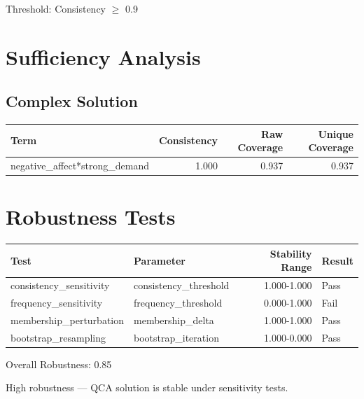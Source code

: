 \documentclass[12pt,a4paper]{article}
\begin{document}
Threshold: Consistency $\geq$ 0.9


\section{Sufficiency Analysis}

\subsection{Complex Solution}

\begin{tabular}{lrrr}
\toprule
Term & Consistency & Raw Coverage & Unique Coverage \\
\midrule

    negative\_affect*strong\_demand & 1.000 & 0.937 & 0.937 \\

\bottomrule
\end{tabular}


\section{Robustness Tests}
\begin{tabular}{llrl}
\toprule
Test & Parameter & Stability Range & Result \\
\midrule
    consistency\_sensitivity & consistency\_threshold & 1.000-1.000 & Pass \\
    frequency\_sensitivity & frequency\_threshold & 0.000-1.000 & Fail \\
    membership\_perturbation & membership\_delta & 1.000-1.000 & Pass \\
    bootstrap\_resampling & bootstrap\_iteration & 1.000-0.000 & Pass \\
\bottomrule
\end{tabular}

Overall Robustness: 0.85

High robustness — QCA solution is stable under sensitivity tests.
\end{document}
